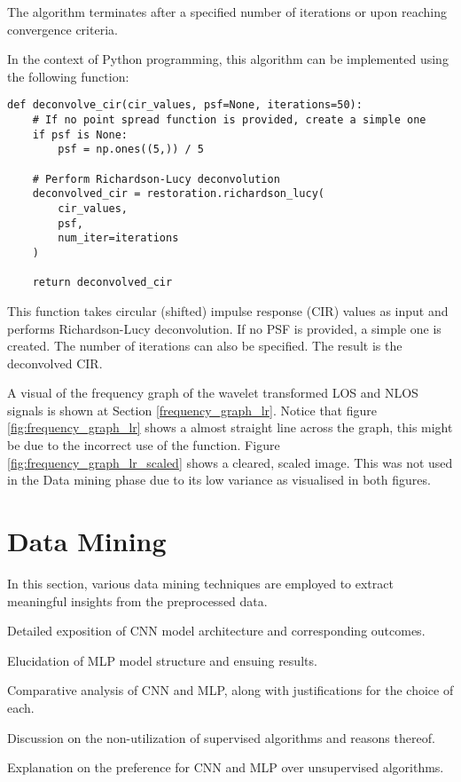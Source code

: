 \documentclass[
	article, %
	11pt, %
	draft, %
]{CSUniSchoolLabReport}
\begin{document}
The algorithm terminates after a specified number of iterations or upon reaching convergence criteria.

In the context of Python programming, this algorithm can be implemented using the following function:

\begin{verbatim}
def deconvolve_cir(cir_values, psf=None, iterations=50):
    # If no point spread function is provided, create a simple one
    if psf is None:
        psf = np.ones((5,)) / 5

    # Perform Richardson-Lucy deconvolution
    deconvolved_cir = restoration.richardson_lucy(
        cir_values, 
        psf, 
        num_iter=iterations
    )

    return deconvolved_cir
\end{verbatim}

This function takes circular (shifted) impulse response (CIR) values as input and performs Richardson-Lucy deconvolution. If no PSF is provided, a simple one is created. The number of iterations can also be specified. The result is the deconvolved CIR.

A visual of the frequency graph of the wavelet transformed LOS and NLOS signals is shown at Section \ref{frequency_graph_lr}. Notice that figure \ref{fig:frequency_graph_lr} shows a almost straight line across the graph, this might be due to the incorrect use of the function. Figure \ref{fig:frequency_graph_lr_scaled} shows a cleared, scaled image. This was not used in the Data mining phase due to its low variance as visualised in both figures.



\section{Data Mining}\label{data_mining}

In this section, various data mining techniques are employed to extract meaningful insights from the preprocessed data.

\begin{description}[style=nextline]
    \item[Convolution Neural Network (CNN):] Detailed exposition of CNN model architecture and corresponding outcomes.
    \item[Multilayer Perceptron (MLP):] Elucidation of MLP model structure and ensuing results.
    \item[Comparison Between CNN and MLP:] Comparative analysis of CNN and MLP, along with justifications for the choice of each.
    \item[Supervised Machine Learning Algorithms:] Discussion on the non-utilization of supervised algorithms and reasons thereof.
    \item[Unsupervised Machine Learning Algorithms:] Explanation on the preference for CNN and MLP over unsupervised algorithms.
\end{description}
\end{document}
